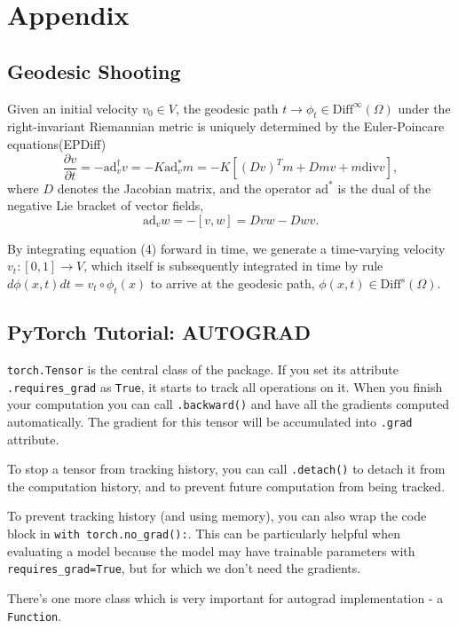 \documentclass{article}
\theoremstyle{definition}
\theoremstyle{plain}
\begin{document}
\section{Appendix}
\subsection{Geodesic Shooting}
Given an initial velocity $v_0\in V$, the geodesic path $t\rightarrow\phi_t\in\mathrm{Diff}^\infty(\Omega)$ under the right-invariant Riemannian metric is uniquely determined by the Euler-Poincare equations(EPDiff)
\begin{equation}
    \frac{\partial v}{\partial t}=-\mathrm{ad}^\dagger_v v=-K\mathrm{ad}^*_vm=-K[(Dv)^Tm+Dmv+m\mathrm{ div } v],
\end{equation}
where $D$ denotes the Jacobian matrix, and the operator $\mathrm{ad}^*$ is the dual of the negative Lie bracket of vector fields,
\begin{equation*}
    \mathrm{ad}_vw=-[v,w]=Dvw-Dwv.
\end{equation*}

By integrating equation (4) forward in time, we generate a time-varying velocity $v_t:[0,1]\rightarrow V$, which itself is subsequently integrated in time by rule $d\phi(x,t)dt=v_t\circ\phi_t(x)$ to arrive at the geodesic path, $\phi(x,t)\in\mathrm{Diff}^s(\Omega)$.

\subsection{PyTorch Tutorial: AUTOGRAD}
\texttt{torch.Tensor} is the central class of the package. If you set its attribute \texttt{.requires\_grad} as \texttt{True}, it starts to track all operations on it. When you finish your computation you can call \texttt{.backward()} and have all the gradients computed automatically. The gradient for this tensor will be accumulated into \texttt{.grad} attribute.

To stop a tensor from tracking history, you can call \texttt{.detach()} to detach it from the computation history, and to prevent future computation from being tracked.

To prevent tracking history (and using memory), you can also wrap the code block in \texttt{with torch.no\_grad():}. This can be particularly helpful when evaluating a model because the model may have trainable parameters with \texttt{requires\_grad=True}, but for which we don’t need the gradients.

There’s one more class which is very important for autograd implementation - a \texttt{Function}.
\end{document}
